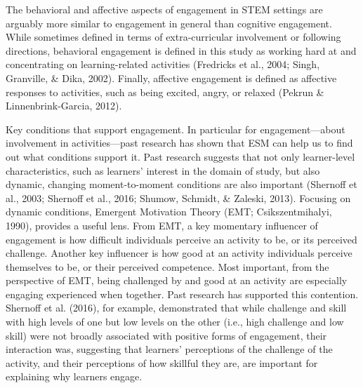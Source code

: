 \documentclass[]{book}
\theoremstyle{definition}
\theoremstyle{definition}
\theoremstyle{definition}
\theoremstyle{remark}
\begin{document}
The behavioral and affective aspects of engagement in STEM settings are
arguably more similar to engagement in general than cognitive
engagement. While sometimes defined in terms of extra-curricular
involvement or following directions, behavioral engagement is defined in
this study as working hard at and concentrating on learning-related
activities (Fredricks et al., 2004; Singh, Granville, \& Dika, 2002).
Finally, affective engagement is defined as affective responses to
activities, such as being excited, angry, or relaxed (Pekrun \&
Linnenbrink-Garcia, 2012).

Key conditions that support engagement. In particular for
engagement---about involvement in activities---past research has shown
that ESM can help us to find out what conditions support it. Past
research suggests that not only learner-level characteristics, such as
learners' interest in the domain of study, but also dynamic, changing
moment-to-moment conditions are also important (Shernoff et al., 2003;
Shernoff et al., 2016; Shumow, Schmidt, \& Zaleski, 2013). Focusing on
dynamic conditions, Emergent Motivation Theory (EMT; Csikszentmihalyi,
1990), provides a useful lens. From EMT, a key momentary influencer of
engagement is how difficult individuals perceive an activity to be, or
its perceived challenge. Another key influencer is how good at an
activity individuals perceive themselves to be, or their perceived
competence. Most important, from the perspective of EMT, being
challenged by and good at an activity are especially engaging
experienced when together. Past research has supported this contention.
Shernoff et al. (2016), for example, demonstrated that while challenge
and skill with high levels of one but low levels on the other (i.e.,
high challenge and low skill) were not broadly associated with positive
forms of engagement, their interaction was, suggesting that learners'
perceptions of the challenge of the activity, and their perceptions of
how skillful they are, are important for explaining why learners engage.
\end{document}
